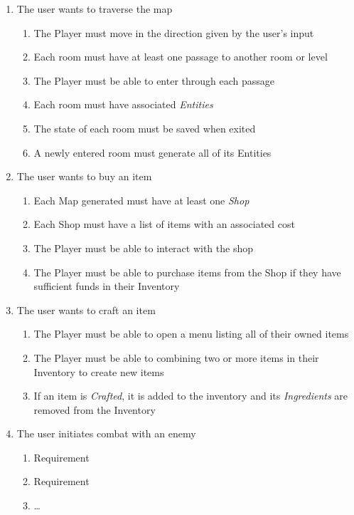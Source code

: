 \documentclass[12pt, titlepage]{article}
\begin{document}
\begin{enumerate}[{VP}1.]
\begin{enumerate}[{BE1}.1]
\begin{enumerate}
    \end{enumerate}
    \item The user wants to traverse the map
    \begin{enumerate}
      \item The Player must move in the direction given by the user's input
      \item Each room must have at least one passage to another room or level
      \item The Player must be able to enter through each passage
      \item Each room must have associated \textit{Entities}
      \item The state of each room must be saved when exited
      \item A newly entered room must generate all of its Entities
    \end{enumerate}
    \item The user wants to buy an item
    \begin{enumerate}
      \item Each Map generated must have at least one \textit{Shop}
      \item Each Shop must have a list of items with an associated cost
      \item The Player must be able to interact with the shop
      \item The Player must be able to purchase items from the Shop if they have sufficient funds in their Inventory
    \end{enumerate}
    \item The user wants to craft an item
    \begin{enumerate}
      \item The Player must be able to open a menu listing all of their owned items
      \item The Player must be able to combining two or more items in their Inventory to create new items
      \item If an item is \textit{Crafted}, it is added to the inventory and its \textit{Ingredients} are removed from the Inventory
    \end{enumerate}
    \item The user initiates combat with an enemy
    \begin{enumerate}
      \item Requirement
      \item Requirement
      \item \dots
    \end{enumerate}

\end{enumerate}
\end{enumerate}
\end{document}
